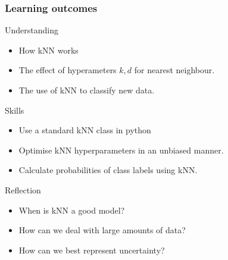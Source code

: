 \begin{frame}
  \frametitle{Learning outcomes}
  \begin{block}{Understanding}
    \begin{itemize}
    \item How kNN works
    \item The effect of hyperameters $k, d$ for nearest neighbour.
    \item The use of kNN to classify new data.
    \end{itemize}
  \end{block}
  
  \begin{block}{Skills}
    \begin{itemize}
    \item Use a standard kNN class in python
    \item Optimise kNN hyperparameters in an unbiased manner.
    \item Calculate probabilities of class labels using kNN.
    \end{itemize}
  \end{block}

  \begin{block}{Reflection}
    \begin{itemize}
    \item When is kNN a good model?
    \item How can we deal with large amounts of data?
    \item How can we best represent uncertainty?
    \end{itemize}
  \end{block}
  
\end{frame}


